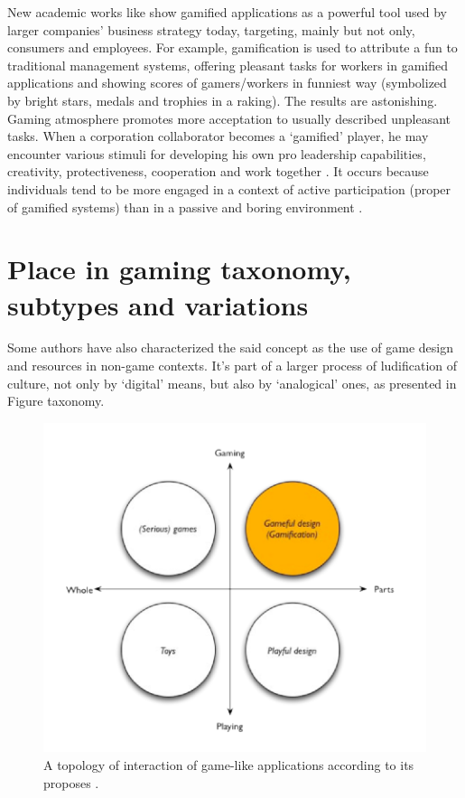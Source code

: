 New academic works like \citep{Gartner} show gamified applications as a powerful tool used by larger companies' business strategy today, targeting, mainly but not only, consumers and employees. For example, gamification is used to attribute a fun to traditional management systems, offering pleasant tasks for workers in gamified applications and showing scores of gamers/workers in funniest way (symbolized by bright stars, medals and trophies in a raking). The results are astonishing. Gaming atmosphere promotes more acceptation to usually described unpleasant tasks. When a corporation collaborator becomes a `gamified' player, he may encounter various stimuli for developing his own pro leadership capabilities, creativity, protectiveness, cooperation and work together \citep{Zich}. It occurs because individuals tend to be more engaged in a context of active participation (proper of gamified systems) than in a passive and boring environment \citep{Medina}.

\section{Place in gaming taxonomy, subtypes and variations}
Some authors \citep{gameAcm} have also characterized the said concept as the use of game design and resources in non-game contexts. It's part of a larger process of ludification of culture, not only by `digital' means, but also by `analogical' ones, as presented in Figure \figurename{taxonomy}.


\begin{figure}[h]
	\begin{center}
		\includegraphics[width=14cm]{chapters/gamification/img/taxonomy.png}
		\caption{A topology of interaction of game-like applications according to its proposes \citep{gameAcm}.}
		\label{taxonomy}
	\end{center}
\end{figure}


